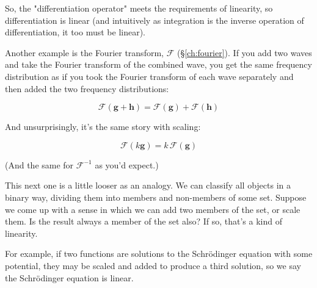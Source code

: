 So, the "differentiation operator" meets the requirements of linearity, so differentiation is linear (and intuitively as integration is the inverse operation of differentiation, it too must be linear).

Another example is the Fourier transform, $\mathcal{F}$ (§\ref{ch:fourier}). If you add two waves and take the Fourier transform of the combined wave, you get the same frequency distribution as if you took the Fourier transform of each wave separately and then added the two frequency distributions:

$$\mathcal{F} (\mathbf{g} + \mathbf{h}) = \mathcal{F} (\mathbf{g}) + \mathcal{F} (\mathbf{h})$$

And unsurprisingly, it's the same story with scaling:

$$\mathcal{F} (k \mathbf{g}) = k \, \mathcal{F} (\mathbf{g})$$

(And the same for $\mathcal{F}^{-1}$ as you'd expect.)

This next one is a little looser as an analogy. We can classify all objects in a binary way, dividing them into members and non-members of some set. Suppose we come up with a sense in which we can add two members of the set, or scale them. Is the result always a member of the set also? If so, that's a kind of linearity.

For example, if two functions are solutions to the Schrödinger equation with some potential, they may be scaled and added to produce a third solution, so we say the Schrödinger equation is linear.

